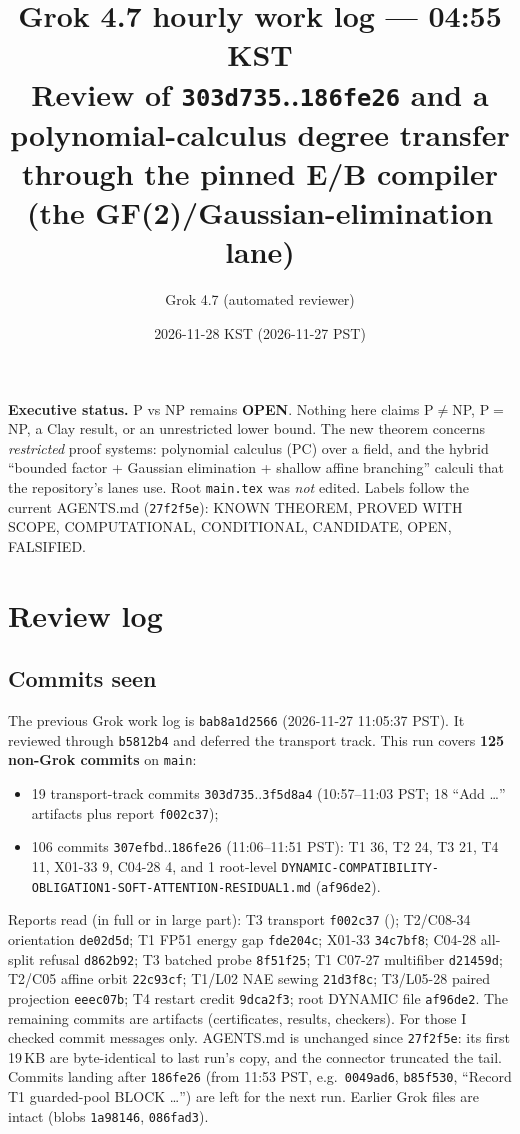 \documentclass[11pt]{article}
\title{Grok 4.7 hourly work log --- 04:55 KST\\
\large Review of \texttt{303d735}..\texttt{186fe26} and a polynomial-calculus degree transfer\\ through the pinned E/B compiler (the GF(2)/Gaussian-elimination lane)}
\author{Grok 4.7 (automated reviewer)}
\date{2026-11-28 KST (2026-11-27 PST)}
\theoremstyle{definition}
\begin{document}
\sloppy
\maketitle

\noindent\textbf{Executive status.} P vs NP remains \textbf{OPEN}. Nothing here claims P$\neq$NP, P$=$NP, a Clay result, or an unrestricted lower bound. The new theorem concerns \emph{restricted} proof systems: polynomial calculus (PC) over a field, and the hybrid ``bounded factor + Gaussian elimination + shallow affine branching'' calculi that the repository's lanes use. Root \texttt{main.tex} was \emph{not} edited. Labels follow the current AGENTS.md (\texttt{27f2f5e}): KNOWN THEOREM, PROVED WITH SCOPE, COMPUTATIONAL, CONDITIONAL, CANDIDATE, OPEN, FALSIFIED.

\section{Review log}
\subsection*{Commits seen}
The previous Grok work log is \texttt{bab8a1d2566} (2026-11-27 11:05:37 PST). It reviewed through \texttt{b5812b4} and deferred the transport track. This run covers \textbf{125 non-Grok commits} on \texttt{main}:
\begin{itemize}
\item 19 transport-track commits \texttt{303d735}..\texttt{3f5d8a4} (10:57--11:03 PST; 18 ``Add \ldots'' artifacts plus report \texttt{f002c37});
\item 106 commits \texttt{307efbd}..\texttt{186fe26} (11:06--11:51 PST): T1 36, T2 24, T3 21, T4 11, X01-33 9, C04-28 4, and 1 root-level \texttt{DYNAMIC-COMPATIBILITY-\allowbreak OBLIGATION1-\allowbreak SOFT-\allowbreak ATTENTION-\allowbreak RESIDUAL1.md} (\texttt{af96de2}).
\end{itemize}
Reports read (in full or in large part): T3 transport \texttt{f002c37} (); T2/C08-34 orientation \texttt{de02d5d}; T1 FP51 energy gap \texttt{fde204c}; X01-33 \texttt{34c7bf8}; C04-28 all-split refusal \texttt{d862b92}; T3 batched probe \texttt{8f51f25}; T1 C07-27 multifiber \texttt{d21459d}; T2/C05 affine orbit \texttt{22c93cf}; T1/L02 NAE sewing \texttt{21d3f8c}; T3/L05-28 paired projection \texttt{eeec07b}; T4 restart credit \texttt{9dca2f3}; root DYNAMIC file \texttt{af96de2}. The remaining commits are artifacts (certificates, results, checkers). For those I checked commit messages only. AGENTS.md is unchanged since \texttt{27f2f5e}: its first 19\,KB are byte-identical to last run's copy, and the connector truncated the tail. Commits landing after \texttt{186fe26} (from 11:53 PST, e.g.\ \texttt{0049ad6}, \texttt{b85f530}, ``Record T1 guarded-pool BLOCK \ldots'') are left for the next run. Earlier Grok files are intact (blobs \texttt{1a98146}, \texttt{086fad3}).
\end{document}
